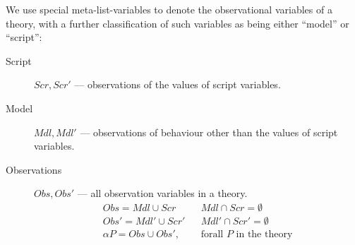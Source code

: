 We use special meta-list-variables to denote the observational
variables of a theory, with a further classification of such
variables as being either ``model'' or ``script'':
\begin{description}
  \item[Script] $Scr, Scr'$ --- observations of the values of script variables.
  \item[Model] $Mdl, Mdl'$ --- observations of behaviour other than
       the values of script variables.
  \item[Observations] $Obs, Obs'$ --- all observation variables in a theory.
    \begin{eqnarray*}
       Obs = Mdl \cup Scr
       &&
       Mdl \cap Scr = \emptyset
    \\ Obs' = Mdl' \cup Scr'
       &&Mdl' \cap Scr' = \emptyset
    \\ \alpha P = Obs \cup Obs', && \mbox{forall $P$ in the theory}
    \end{eqnarray*}
\end{description}
